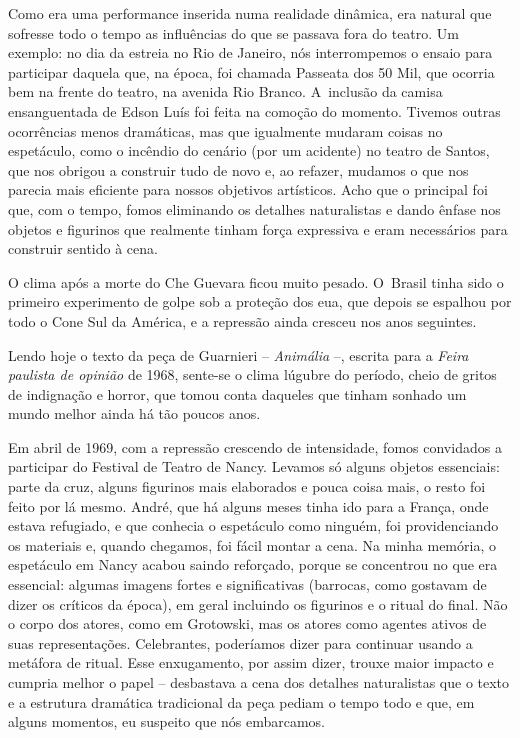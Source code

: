{Como era uma performance inserida numa realidade dinâmica,
era natural que sofresse todo o tempo as influências do que se passava
fora do teatro. Um exemplo: no dia da estreia no Rio de Janeiro, nós
interrompemos o ensaio para participar daquela que, na época, foi chamada
Passeata dos 50 Mil, que ocorria bem na frente do teatro, na avenida
Rio Branco. A~inclusão da camisa ensanguentada de Edson Luís foi feita
na comoção do momento. Tivemos outras ocorrências menos dramáticas, mas
que igualmente mudaram coisas no espetáculo, como o incêndio do cenário
(por um acidente) no teatro de Santos, que nos obrigou a construir tudo de
novo e, ao refazer, mudamos o que nos parecia mais eficiente para
nossos objetivos artísticos. Acho que o principal foi que, com o tempo,
fomos eliminando os detalhes naturalistas e dando ênfase nos objetos e
figurinos que realmente tinham força expressiva e eram necessários para
construir sentido à cena.

O clima após a morte do Che Guevara ficou muito pesado. O~Brasil tinha
sido o primeiro experimento de golpe sob a proteção dos {\sc eua}, que depois
se espalhou por todo o Cone Sul da América, e a repressão ainda cresceu
nos anos seguintes.

Lendo hoje o texto da peça de Guarnieri -- {\it Animália} --, escrita para a
{\it Feira paulista de opinião} de 1968, sente-se o clima lúgubre
do período, cheio de gritos de indignação e horror, que tomou conta
daqueles que tinham sonhado um mundo melhor ainda há tão poucos anos.

Em abril de 1969, com a repressão crescendo de intensidade, fomos convidados a
participar do Festival de Teatro de Nancy.
Levamos só alguns objetos essenciais: parte da cruz, alguns
figurinos mais elaborados e pouca coisa mais, o resto foi feito por lá
mesmo. André, que há alguns meses tinha ido para a França, onde estava
refugiado, e que conhecia o espetáculo como ninguém, foi providenciando
os materiais e, quando chegamos, foi fácil montar a cena. Na minha memória,
o espetáculo em Nancy acabou saindo reforçado, porque se concentrou no
que era essencial: algumas imagens fortes e significativas (barrocas,
como gostavam de dizer os críticos da época), em geral incluindo os
figurinos e o ritual do final. Não o corpo dos atores, como em Grotowski,
mas os atores como agentes ativos de suas representações. Celebrantes,
poderíamos dizer para continuar usando a metáfora de ritual. Esse
enxugamento, por assim dizer, trouxe maior impacto e cumpria melhor o papel --
desbastava a cena dos detalhes naturalistas que o texto e a
estrutura dramática tradicional da peça pediam o tempo todo e que, em
alguns momentos, eu suspeito que nós embarcamos.

}

